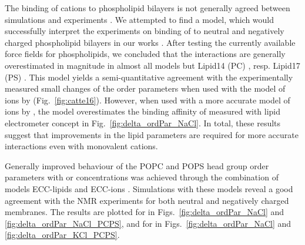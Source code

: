 
The binding of  cations to phospholipid bilayers 
is not generally agreed between simulations 
\citep{bockmann03,sachs04,berkowitz06,cordomi09}
and experiments 
\citep{cevc90,tocanne90,hauser76,herbette84,uhrikova08}.
We attempted to find a model, 
which would successfully interpret the experiments on binding of 
to neutral and negatively charged phospholipid bilayers \citep{akutsu81, roux90} 
in our works \citep{catte16, nmrlipids_proj4}.
After testing the currently available force fields for phospholipids,
we concluded
that the interactions are generally overestimated in magnitude in almost all models 
but Lipid14 (PC) \citep{dickson14}, resp. Lipid17 (PS) \citep{lipid17-future}. 
This model yields a semi-quantitative agreement with the experimentally measured small changes of the order parameters 
when used with the model of ions by \citet{aqvist90} (Fig.~\ref{fig:catte16}). 
However, when used with a more accurate model of ions by \citet{Pluharova2014, martinek17},
the model overestimates the binding affinity of 
measured with lipid electrometer concept in Fig.~\ref{fig:delta_ordPar_NaCl}. \citep{melcr18}
In total, these results suggest that improvements 
in the lipid parameters are required for more accurate interactions even with monovalent cations. 
\citep{catte16, melcr18, nmrlipids_proj4}

Generally improved behaviour 
of the POPC and POPS head group order parameters 
with  or  concentrations 
was achieved through the combination of models 
ECC-lipids \citep{melcr18} and ECC-ions \citep{martinek17, kohagen16, Pluharova2014}. 
Simulations with these models 
reveal a good agreement with the NMR experiments 
for both neutral and negatively charged membranes.
The results are plotted for  in Figs.~\ref{fig:delta_ordPar_NaCl} and \ref{fig:delta_ordPar_NaCl_PCPS}, 
and for  in Figs.~\ref{fig:delta_ordPar_NaCl} and \ref{fig:delta_ordPar_KCl_PCPS}. 


